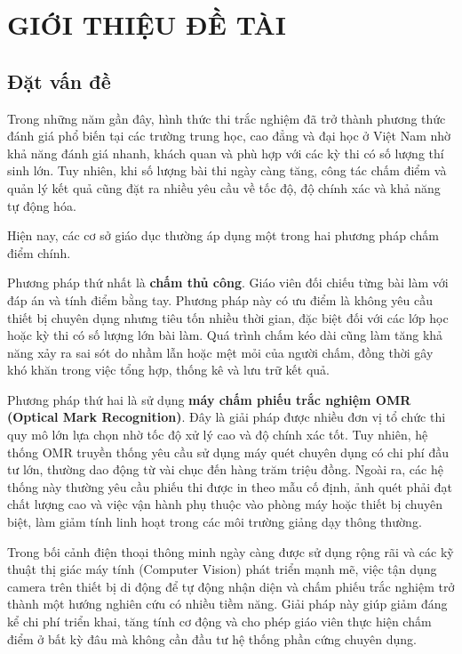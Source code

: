 \chapter{GIỚI THIỆU ĐỀ TÀI}
\section{Đặt vấn đề}

Trong những năm gần đây, hình thức thi trắc nghiệm đã trở thành phương thức đánh giá phổ biến tại các trường trung học, cao đẳng và đại học ở Việt Nam nhờ khả năng đánh giá nhanh, khách quan và phù hợp với các kỳ thi có số lượng thí sinh lớn. Tuy nhiên, khi số lượng bài thi ngày càng tăng, công tác chấm điểm và quản lý kết quả cũng đặt ra nhiều yêu cầu về tốc độ, độ chính xác và khả năng tự động hóa.

Hiện nay, các cơ sở giáo dục thường áp dụng một trong hai phương pháp chấm điểm chính.

Phương pháp thứ nhất là \textbf{chấm thủ công}. Giáo viên đối chiếu từng bài làm với đáp án và tính điểm bằng tay. Phương pháp này có ưu điểm là không yêu cầu thiết bị chuyên dụng nhưng tiêu tốn nhiều thời gian, đặc biệt đối với các lớp học hoặc kỳ thi có số lượng lớn bài làm. Quá trình chấm kéo dài cũng làm tăng khả năng xảy ra sai sót do nhầm lẫn hoặc mệt mỏi của người chấm, đồng thời gây khó khăn trong việc tổng hợp, thống kê và lưu trữ kết quả.

Phương pháp thứ hai là sử dụng \textbf{máy chấm phiếu trắc nghiệm OMR (Optical Mark Recognition)}. Đây là giải pháp được nhiều đơn vị tổ chức thi quy mô lớn lựa chọn nhờ tốc độ xử lý cao và độ chính xác tốt. Tuy nhiên, hệ thống OMR truyền thống yêu cầu sử dụng máy quét chuyên dụng có chi phí đầu tư lớn, thường dao động từ vài chục đến hàng trăm triệu đồng. Ngoài ra, các hệ thống này thường yêu cầu phiếu thi được in theo mẫu cố định, ảnh quét phải đạt chất lượng cao và việc vận hành phụ thuộc vào phòng máy hoặc thiết bị chuyên biệt, làm giảm tính linh hoạt trong các môi trường giảng dạy thông thường.

Trong bối cảnh điện thoại thông minh ngày càng được sử dụng rộng rãi và các kỹ thuật thị giác máy tính (Computer Vision) phát triển mạnh mẽ, việc tận dụng camera trên thiết bị di động để tự động nhận diện và chấm phiếu trắc nghiệm trở thành một hướng nghiên cứu có nhiều tiềm năng. Giải pháp này giúp giảm đáng kể chi phí triển khai, tăng tính cơ động và cho phép giáo viên thực hiện chấm điểm ở bất kỳ đâu mà không cần đầu tư hệ thống phần cứng chuyên dụng.


